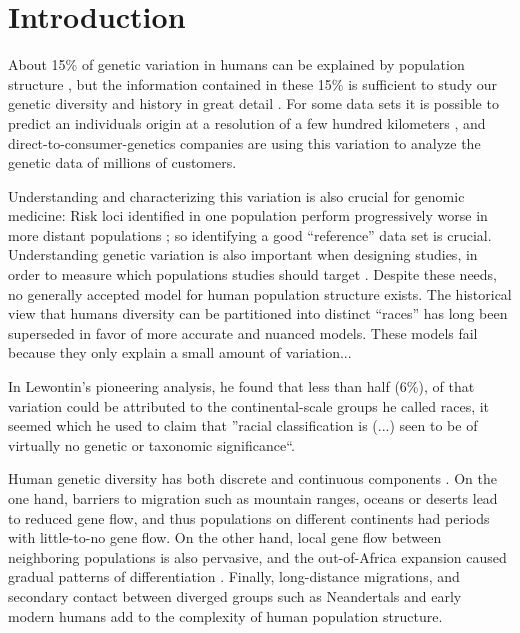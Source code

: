 \documentclass[12pt,a4pape, fullpage]{article}
\begin{document}
\section{Introduction}
About 15\% of genetic variation in humans can be explained by population structure \citep{dobzhansky1972, barbujani1997, rosenberg2002}, but the information contained in these 15\% is sufficient to study our genetic diversity and history in great detail \citep{cavalli-sforza1994,reich2018a}. For some data sets it is possible to predict an individuals origin at a resolution of a few hundred kilometers \citep{novembre2008, leslie2015}, and direct-to-consumer-genetics companies are using this variation to analyze the genetic data of millions of customers.

Understanding and characterizing this variation is also crucial for genomic medicine: Risk loci identified in one population perform progressively worse in more distant populations \citep{berg2019, duncan2019}; so identifying a good ``reference'' data set is crucial. Understanding genetic variation is also important when designing studies, in order to measure which populations studies should target \citep{fullerton2016}. Despite these needs, no generally accepted model for human population structure exists. The historical view that humans diversity can be partitioned into  distinct ``races'' \citep[e.g.][]{blumenback1798} has long been superseded in favor of more accurate and nuanced models. These models fail because they only explain a small amount of variation...

In Lewontin's pioneering analysis, he found that less than half (6\%), of that variation could be attributed to the continental-scale groups he called races, it seemed  which he used to claim that ''racial classification is (...) seen to be of virtually no genetic or taxonomic significance``.

Human genetic diversity has both discrete and continuous components \citep{rosenberg2002, rosenberg2005, bradburd2015,  reich2018, peter2020a}. On the one hand, barriers to migration such as mountain ranges, oceans or deserts lead to reduced gene flow, and thus populations on different continents had periods with little-to-no gene flow. On the other hand, local gene flow between neighboring populations is also pervasive, and the out-of-Africa expansion caused gradual patterns of differentiation \cite{ramachandran2005}. Finally, long-distance migrations, and secondary contact between diverged groups such as Neandertals and early modern humans add to the complexity of human population structure.
\end{document}

